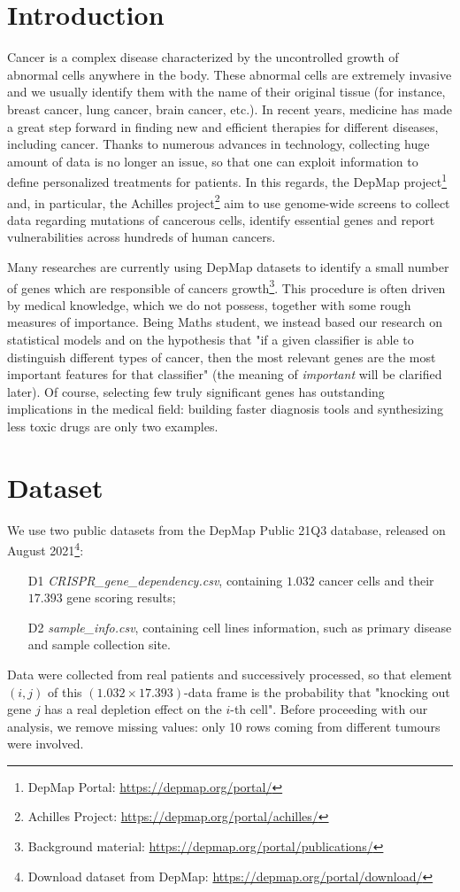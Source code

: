 \documentclass[a4paper,11pt, oneside]{article}  %
\begin{document}
\section{Introduction}
Cancer is a complex disease characterized by the uncontrolled growth of abnormal cells anywhere in the body. These abnormal cells are extremely invasive and we usually identify them with the name of their original tissue (for instance, breast cancer, lung cancer,  brain cancer, etc.).  In recent years, medicine has made a great step forward in finding new and efficient therapies for different diseases, including cancer.  Thanks to numerous advances in technology,  collecting huge amount of data is no longer an issue, so that one can exploit information to define personalized treatments for patients. In this regards, the DepMap project\footnote{DepMap Portal: \url{https://depmap.org/portal/} } and,  in particular,  the Achilles project\footnote{Achilles Project: \url{https://depmap.org/portal/achilles/} } aim to use genome-wide screens to collect data regarding mutations of cancerous cells,  identify essential genes and report vulnerabilities across hundreds of human cancers. 

Many researches are currently using DepMap datasets to identify a small number of genes which are responsible of cancers growth\footnote{Background material: \url{https://depmap.org/portal/publications/}}. This procedure is often driven by medical knowledge,  which we do not possess,  together with some rough measures of importance.  Being Maths student, we instead based our research on statistical models and on the hypothesis that "if a given classifier is able to distinguish different types of cancer, then the most relevant genes are the most important features for that classifier" (the meaning of \textit{important} will be clarified later).  Of course,  selecting few truly significant genes has outstanding implications in the medical field: building faster diagnosis tools and synthesizing less toxic drugs are only two examples. 


\section{Dataset}
We use two public datasets from the DepMap Public 21Q3 database,  released on August 2021\footnote{Download dataset from DepMap:  \url{https://depmap.org/portal/download/}}:
\begin{itemize}
	\item[D1] \textit{CRISPR\_gene\_dependency.csv}, containing $1.032$ cancer cells and their $17.393$ gene scoring results;
	\item[D2] \textit{sample\_info.csv}, containing cell lines information,  such as primary disease and sample collection site.
\end{itemize}
Data were collected from real patients and successively processed, so that element $(i, j)$ of this $(1.032 \times 17.393)$-data frame is the probability that "knocking out gene $j$ has a real depletion effect on the $i$-th cell".
Before proceeding with our analysis, we remove missing values: only 10 rows coming from different tumours were involved. 
\end{document}
